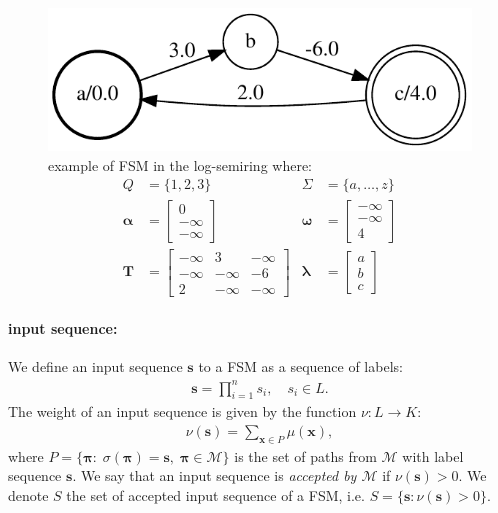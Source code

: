 \begin{figure}[t]
    \centering
    \includegraphics[scale=0.6]{images/fsm1.pdf}
    \captionsetup{singlelinecheck=off}
    \caption[example/fsm1]{example of FSM in the log-semiring where:
    \begin{align}
        Q &= \{1, 2, 3\} & \Sigma &= \{a, \dots, z\} \\
        \boldsymbol{\alpha} &= \begin{bmatrix}
            0 \\
            -\infty \\
            -\infty
        \end{bmatrix} &
        \boldsymbol{\omega} &= \begin{bmatrix}
            -\infty \\
            -\infty \\
            4
        \end{bmatrix} \\
        \mathbf{T} &= \begin{bmatrix}
            -\infty & 3 & -\infty \\
            -\infty & -\infty & -6 \\
            2 & -\infty & -\infty
        \end{bmatrix} &
        \boldsymbol{\lambda} &= \begin{bmatrix}
            a \\
            b \\
            c
        \end{bmatrix}
    \end{align}}
    \label{fsm:fig:example1}
\end{figure}

\paragraph{input sequence:} We define an input sequence $\mathbf{s}$ to
a FSM as a sequence of labels:
\begin{align}
    \mathbf{s} = \prod_{i=1}^n s_i, \quad s_i \in L.
\end{align}
The weight of an input sequence is given by the function
$\nu: L \rightarrow K$:
\begin{align}
    \nu(\mathbf{s}) = \sum_{ \mathbf{x} \in P} \mu(\mathbf{x}),
\end{align}
where $P = \{\boldsymbol{\pi} : \; \sigma(\boldsymbol{\pi}) = \mathbf{s}, \;
\boldsymbol{\pi} \in \mathcal{M} \}$ is the set of paths from
$\mathcal{M}$ with label sequence $\mathbf{s}$.
We say that an input sequence is \emph{accepted by $\mathcal{M}$} if
$\nu(\mathbf{s}) > 0$. We denote $S$ the set of accepted input sequence
of a FSM, i.e. $S = \{\mathbf{s} : \nu(\mathbf{s}) > 0 \}$.

